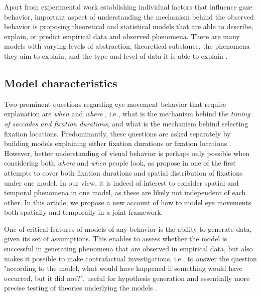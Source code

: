 \documentclass{article}
\begin{document}
Apart from experimental work establishing individual factors that influence gaze behavior, important aspect of understanding the mechanism behind the observed behavior is proposing theoretical and statistical models that are able to describe, explain, or predict empirical data and observed phenomena. There are many models with varying levels of abstraction, theoretical substance, the phenomena they aim to explain, and the type and level of data it is able to explain \citep{tatler2017latest,trukenbrod2014icat,nuthmann2017fixation_durations,zelinsky2013modelling,schutt2017likelihood,schwetlick2020ccenewalk_extendeds,le_meur2015saccadic,malem2020exploration}. 

\subsection{Model characteristics}

Two prominent questions regarding eye movement behavior that require explanation are \textit{when} and \textit{where} \citep{tatler2017latest}, i.e., what is the mechanism behind the \textit{timing of saccades and fixation durations}, and what is the mechanism behind selecting fixation locations. Predominantly, these questions are asked separately by building models explaining either fixation durations or fixation locations \citep{tatler2017latest,schutt2017likelihood}. However, better understanding of visual behavior is perhaps only possible when considering both \textit{where} and \textit{when} people look, as \citet{tatler2017latest} propose in one of the first attempts to cover both fixation durations and spatial distribution of fixations under one model. In our view, it is indeed of interest to consider spatial and temporal phenomena in one model, as these are likely not independent of each other. In this article, we propose a new account of how to model eye movements both spatially and temporally in a joint framework.

One of critical features of models of any behavior is the ability to generate data, given its set of assumptions. This enables to assess whether the model is successful in generating phenomena that are observed in empirical data, but also makes it possible to make contrafactual investigations, i.e., to answer the question "according to the model, what would have happened if something would have occurred, but it did not?", useful for hypothesis generation and essentially more precise testing of theories underlying the models \citep{borsboom2020theory,nuthmann2010crisp}.
\end{document}

